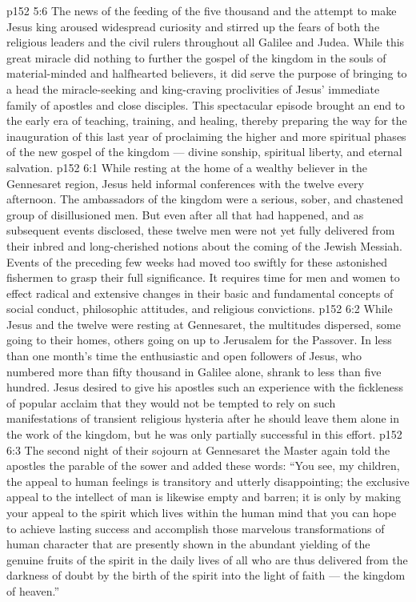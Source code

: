 \vs p152 5:6 The news of the feeding of the five thousand and the attempt to make Jesus king aroused widespread curiosity and stirred up the fears of both the religious leaders and the civil rulers throughout all Galilee and Judea. While this great miracle did nothing to further the gospel of the kingdom in the souls of material\hyp{}minded and halfhearted believers, it did serve the purpose of bringing to a head the miracle\hyp{}seeking and king\hyp{}craving proclivities of Jesus’ immediate family of apostles and close disciples. This spectacular episode brought an end to the early era of teaching, training, and healing, thereby preparing the way for the inauguration of this last year of proclaiming the higher and more spiritual phases of the new gospel of the kingdom --- divine sonship, spiritual liberty, and eternal salvation.
\vs p152 6:1 While resting at the home of a wealthy believer in the Gennesaret region, Jesus held informal conferences with the twelve every afternoon. The ambassadors of the kingdom were a serious, sober, and chastened group of disillusioned men. But even after all that had happened, and as subsequent events disclosed, these twelve men were not yet fully delivered from their inbred and long\hyp{}cherished notions about the coming of the Jewish Messiah. Events of the preceding few weeks had moved too swiftly for these astonished fishermen to grasp their full significance. It requires time for men and women to effect radical and extensive changes in their basic and fundamental concepts of social conduct, philosophic attitudes, and religious convictions.
\vs p152 6:2 While Jesus and the twelve were resting at Gennesaret, the multitudes dispersed, some going to their homes, others going on up to Jerusalem for the Passover. In less than one month’s time the enthusiastic and open followers of Jesus, who numbered more than fifty thousand in Galilee alone, shrank to less than five hundred. Jesus desired to give his apostles such an experience with the fickleness of popular acclaim that they would not be tempted to rely on such manifestations of transient religious hysteria after he should leave them alone in the work of the kingdom, but he was only partially successful in this effort.
\vs p152 6:3 \pc The second night of their sojourn at Gennesaret the Master again told the apostles the parable of the sower and added these words: \textcolor{ubdarkred}{“You see, my children, the appeal to human feelings is transitory and utterly disappointing; the exclusive appeal to the intellect of man is likewise empty and barren; it is only by making your appeal to the spirit which lives within the human mind that you can hope to achieve lasting success and accomplish those marvelous transformations of human character that are presently shown in the abundant yielding of the genuine fruits of the spirit in the daily lives of all who are thus delivered from the darkness of doubt by the birth of the spirit into the light of faith --- the kingdom of heaven.”}
